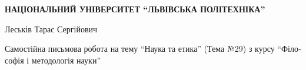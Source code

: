 \begin{titlepage}
    \begin{center}
        \textbf{{\selectfont НАЦІОНАЛЬНИЙ УНІВЕРСИТЕТ \foreignquote{ukrainian}{ЛЬВІВСЬКА ПОЛІТЕХНІКА} }} \\
    \end{center}
    \vspace{2.2cm}
    \begin{center}
        Леськів Тарас Сергійович
    \end{center}
    \vspace{0.5cm}
    \vspace{1cm}
    \begin{center}
        Самостійна письмова робота на тему \foreignquote{ukrainian}{Наука та етика} (Тема №29) з курсу \foreignquote{ukrainian}{Філософія і методологія науки}\par
    \end{center}



\end{titlepage}
